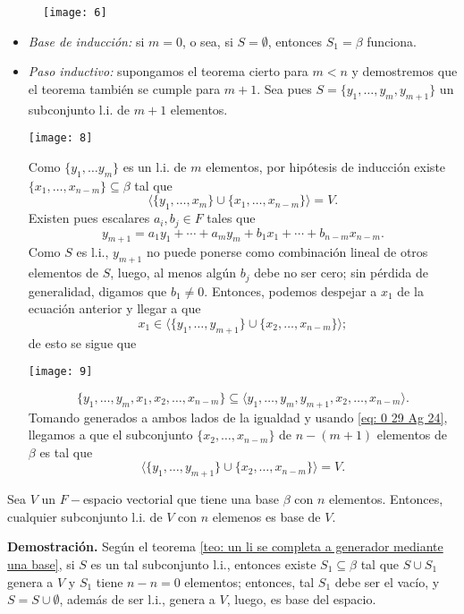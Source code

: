 \begin{figure}[H]
\centering\captionsetup{format = hang}
	\begin{measuredfigure}
		\texttt{[image: 6]} 
 	\end{measuredfigure}
 \end{figure}
\begin{itemize}
\item \textit{Base de inducción:} si $m = 0$, o sea, si $S = \emptyset$,
entonces $S_{1} = \beta$ funciona.
\item \textit{Paso inductivo:} supongamos el teorema cierto para 
$m < n$ y demostremos que el teorema también se cumple para
$m+1$. Sea pues $S = \{ y_{1}, \ldots , y_{m}, y_{m+1} \}$
un subconjunto l.i. de $m+1$ elementos. 
\begin{marginfigure}
\texttt{[image: 8]} 
\end{marginfigure}
Como $\{ y_{1}, \ldots y_{m} \}$ es un l.i. de $m$ elementos, por
hipótesis de inducción existe 
$\{ x_{1}, \ldots , x_{n-m} \} \subseteq \beta$ tal que 
\begin{equation}
	\label{eq: 0 29 Ag 24}
	\langle \{ y_{1}, \ldots , x_{m} \} \cup
	\{ x_{1}, \ldots , x_{n-m} \} \rangle = V.
\end{equation}
Existen pues escalares $a_{i}, b_{j} \in F$
tales que
\[
y_{m+1} = a_{1}y_{1} + \cdots + a_{m}y_{m} + 
b_{1}x_{1} + \cdots + b_{n-m}x_{n-m}.
\] 
Como $S$ es l.i., $y_{m+1}$ no puede ponerse como combinación
lineal de otros elementos de $S$, luego, al menos
algún $b_{j}$ debe no ser cero; sin pérdida de generalidad,
digamos que $b_{1} \neq 0$. Entonces, podemos despejar a 
$x_{1}$ de la ecuación anterior y llegar a que 
\[
x_{1} \in \langle \{ y_{1}, \ldots , y_{m+1} \} \cup
\{ x_{2}, \ldots , x_{n-m} \} \rangle;
\]
de esto se sigue que 
\begin{marginfigure}
\texttt{[image: 9]} 
\end{marginfigure}
\[
\{ y_{1}, \ldots , y_{m}, x_{1}, x_{2}, \ldots , x_{n-m} \}
\subseteq 
\langle
y_{1}, \ldots , y_{m}, y_{m+1}, x_{2}, \ldots, x_{n-m}
\rangle.
\]
Tomando generados a ambos lados de la igualdad y usando 
\eqref{eq: 0 29 Ag 24}, llegamos a que 
el subconjunto $\{x_{2}, \ldots , x_{n-m} \}$ de
$n-(m+1)$ elementos de $\beta$ es tal que 
\[
\langle
\{ y_{1}, \ldots , y_{m+1} \} \cup
\{ x_{2}, \ldots , x_{n-m} \}
\rangle = V.
\]
\end{itemize}
\QEDB
\vspace{0.2cm}

\begin{cor}
	\label{cor: li con n element es base}
Sea $V$ un $F-$espacio vectorial que tiene una base
$\beta$ con $n$ elementos. Entonces, cualquier subconjunto
l.i. de $V$ con $n$ elemenos es base de $V$. 
\end{cor}
\noindent
\textbf{Demostración.}
Según el teorema 
\ref{teo: un li se completa a generador mediante una base},
si $S$ es un tal subconjunto l.i., entonces existe $S_{1} \subseteq \beta$
tal que $S \cup S_{1}$ genera a $V$ y $S_{1}$ tiene
$n-n=0$ elementos; entonces, tal $S_{1}$ debe ser el vacío,
y $S = S \cup \emptyset$, además de ser l.i., genera a $V$,
luego, es base del espacio.


